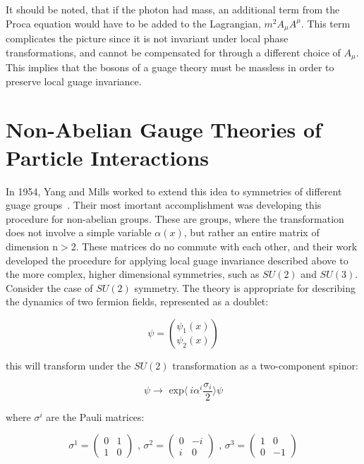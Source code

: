\par It should be noted, that if the photon had mass, an additional
term from the Proca equation would have to be added to the Lagrangian,
$m^{2}A_{\mu}A^{\mu}$.  This term complicates the picture since it is
not invariant under local phase transformations, and cannot be
compensated for through a different choice of $A_{\mu}$.  This implies
that the bosons of a guage theory must be massless in order to
preserve local guage invariance.  


\section{Non-Abelian Gauge Theories of Particle Interactions}
\label{non_abelian_gauge_theory_overview}
\par In 1954, Yang and Mills worked to extend this idea to symmetries
of different guage groups~\cite{th:Yang_Mills}.  Their most imortant
accomplishment was developing this procedure for non-abelian groups.
These are groups, where the transformation does not involve a simple
variable $\alpha(x)$, but rather an entire matrix of dimension n$>$2.
These matrices do no commute with each other, and their work developed
the procedure for applying local guage invariance described above to
the more complex, higher dimensional symmetries, such as $SU(2)$ and
$SU(3)$.  Consider the case of $SU(2)$ symmetry.  The theory is
appropriate for describing the dynamics of two fermion fields,
represented as a doublet:

\begin{equation}\label{eq:yang_mills_fermion_doublet}
\psi = \binom{\psi_{1}(x)}{\psi_{2}(x)}
\end{equation}

\noindent this will transform under the $SU(2)$ transformation as a
two-component spinor:

\begin{equation}\label{eq:yang_mills_fermion_transformaiton}
\psi \rightarrow \text{ exp}\langle~i\alpha^{i}\frac{\sigma_{i}}{2}\rangle\psi
\end{equation} 

\noindent where $\sigma^{i}$ are the Pauli matrices:

\begin{equation}\label{eq:pauli_matrices}
\sigma^{1} = 
  \begin{pmatrix}
    0  &  1 \\
    1  &  0
  \end{pmatrix}
\text{   ,    }
\sigma^{2} = 
  \begin{pmatrix}
    0  & -i \\
    i  &  0
  \end{pmatrix}
\text{   ,   }
\sigma^{3} = 
  \begin{pmatrix}
    1  &   0 \\
    0  & -1
  \end{pmatrix}
\end{equation}

